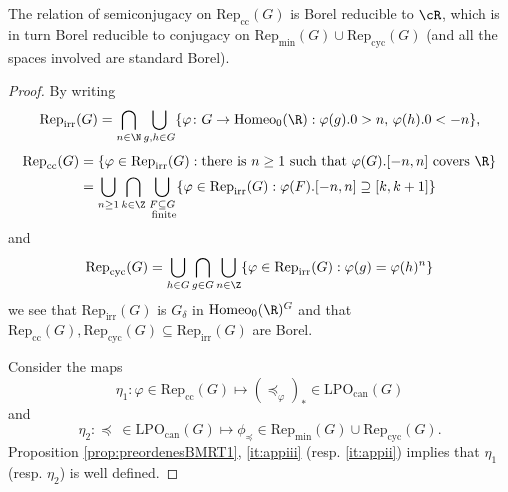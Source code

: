 \documentclass[reqno]{amsart}
\begin{document}
\begin{prop}  \label{prop:reduccion}
The relation of semiconjugacy on $\mathrm{Rep}_\mathrm{cc}(G)$ is Borel reducible to $\cR$, which is in turn Borel reducible to conjugacy on $\mathrm{Rep}_\mathrm{min}(G) \cup \mathrm{Rep}_\mathrm{cyc}(G)$ (and all the spaces involved are standard Borel).
\end{prop}
\begin{proof}
By writing
\[
	\mathrm{Rep}_\mathrm{irr}(G) = \bigcap_{n \in \N} \bigcup_{g,h \in G} \{ \varphi \colon G \to \mathrm{Homeo}_0(\R) : \varphi(g).0> n,\, \varphi(h).0<-n\},
\]
\begin{align*}
	\mathrm{Rep}_\mathrm{cc}(G)  & = \{\varphi \in \mathrm{Rep}_\mathrm{irr}(G) : \text{there is }n\geq 1 \text{ such that } \varphi(G).[-n,n] \text{ covers }\R\} \\
	 & = \bigcup_{n \geq 1} \bigcap_{k \in \Z} \bigcup_{\substack{F \subseteq G\\ \text{ finite}} } \{\varphi \in \mathrm{Rep}_\mathrm{irr}(G) : \varphi(F).[-n,n] \supseteq [k,k+1]\}
\end{align*}
and
\[
	\mathrm{Rep}_\mathrm{cyc}(G) = \bigcup_{h \in G} \bigcap_{g \in G} \bigcup_{n \in \Z}\{ \varphi \in \mathrm{Rep}_\mathrm{irr}(G) : \varphi(g) = \varphi(h)^n\}
\]
we see that $\mathrm{Rep}_\mathrm{irr}(G)$ is $G_\delta$ in $\mathrm{Homeo}_0(\R)^G$ and that $\mathrm{Rep}_\mathrm{cc}(G), \mathrm{Rep}_\mathrm{cyc}(G) \subseteq \mathrm{Rep}_\mathrm{irr}(G)$ are Borel.

Consider the maps
\[
	\eta_1 \colon \varphi \in \mathrm{Rep}_\mathrm{cc}(G) \mapsto (\preceq_\varphi)_\ast \in \mathrm{LPO}_\mathrm{can}(G) \]
and
\[
	\eta_2 \colon \preceq \ \in \mathrm{LPO}_\mathrm{can}(G) \mapsto \phi_\preceq \in \mathrm{Rep}_\mathrm{min}(G) \cup \mathrm{Rep}_\mathrm{cyc}(G).
\]
Proposition \ref{prop:preordenesBMRT1}, \eqref{it:appiii} (resp. \eqref{it:appii}) implies that $\eta_1$ (resp. $\eta_2$) is well defined.%


\end{proof}
\end{document}
